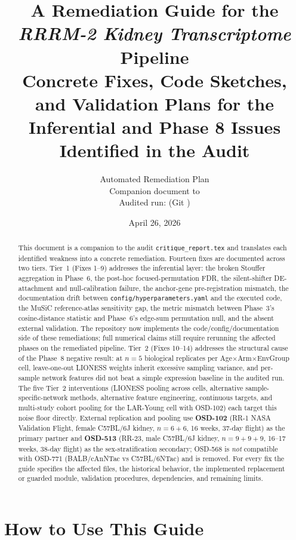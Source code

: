 \documentclass[11pt]{article}
\title{\textbf{A Remediation Guide for the \\
\emph{RRRM-2 Kidney Transcriptome} Pipeline} \\[0.5em]
\large Concrete Fixes, Code Sketches, and Validation Plans for the \\
Inferential and Phase 8 Issues Identified in the Audit}
\author{Automated Remediation Plan \\
\small Companion document to \code{critique\_report.tex} \\
\small Audited run: \code{run\_20260408\_191759\_2500g} (Git \code{90ee5bf})}
\date{April 26, 2026}
\newcommand{\code}[1]{\texttt{#1}}
\begin{document}
\maketitle

\begin{abstract}
\noindent
This document is a companion to the audit \code{critique\_report.tex} and translates each identified weakness into a concrete remediation. Fourteen fixes are documented across two tiers. Tier~1 (Fixes 1--9) addresses the inferential layer: the broken Stouffer aggregation in Phase~6, the post-hoc focused-permutation FDR, the silent-shifter DE-attachment and null-calibration failure, the anchor-gene pre-registration mismatch, the documentation drift between \code{config/hyperparameters.yaml} and the executed code, the MuSiC reference-atlas sensitivity gap, the metric mismatch between Phase~3's cosine-distance statistic and Phase~6's edge-sum permutation null, and the absent external validation. The repository now implements the code/config/documentation side of these remediations; full numerical claims still require rerunning the affected phases on the remediated pipeline. Tier~2 (Fixes 10--14) addresses the structural cause of the Phase~8 negative result: at $n{=}5$ biological replicates per Age$\times$Arm$\times$EnvGroup cell, leave-one-out LIONESS weights inherit excessive sampling variance, and per-sample network features did not beat a simple expression baseline in the audited run. The five Tier~2 interventions (LIONESS pooling across cells, alternative sample-specific-network methods, alternative feature engineering, continuous targets, and multi-study cohort pooling for the LAR-Young cell with OSD-102) each target this noise floor directly. External replication and pooling use \textbf{OSD-102} (RR-1 NASA Validation Flight, female C57BL/6J kidney, $n{=}6{+}6$, 16 weeks, 37-day flight) as the primary partner and \textbf{OSD-513} (RR-23, male C57BL/6J kidney, $n{=}9{+}9{+}9$, 16--17 weeks, 38-day flight) as the sex-stratification secondary; OSD-568 is \emph{not} compatible with OSD-771 (BALB/cAnNTac vs C57BL/6NTac) and is removed. For every fix the guide specifies the affected files, the historical behavior, the implemented replacement or guarded module, validation procedures, dependencies, and remaining limits.
\end{abstract}

\tableofcontents
\clearpage

\section{How to Use This Guide}
\end{document}
